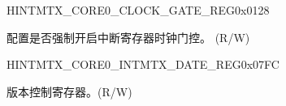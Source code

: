 \begin{register}{H}{INTMTX\_CORE0\_CLOCK\_GATE\_REG}{0x0128}\label{regdesc:INTMTXCORE0CLOCKGATEREG}
%
%
\regnewline%
\begin{regdesc}\begin{reglist}
\label{fielddesc:INTMTXCORE0REGCLKEN}\item [INTMTX\_CORE0\_REG\_CLK\_EN] 配置是否强制开启中断寄存器时钟门控。 (R/W)
\end{reglist}\end{regdesc}
\end{register}


\begin{register}{H}{INTMTX\_CORE0\_INTMTX\_DATE\_REG}{0x07FC}\label{regdesc:INTMTXCORE0INTMTXDATEREG}
%
%
\regnewline%
\begin{regdesc}\begin{reglist}
\label{fielddesc:INTMTXCORE0INTMTXDATE}\item [INTMTX\_CORE0\_INTMTX\_DATE] 版本控制寄存器。(R/W)
\end{reglist}\end{regdesc}
\end{register}


